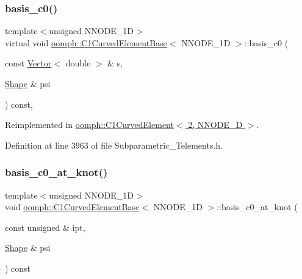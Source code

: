 \subsubsection{\texorpdfstring{basis\+\_\+c0()}{basis\_c0()}}
{\footnotesize\ttfamily template$<$unsigned N\+N\+O\+D\+E\+\_\+1D$>$ \\
virtual void \hyperlink{classoomph_1_1C1CurvedElementBase}{oomph\+::\+C1\+Curved\+Element\+Base}$<$ N\+N\+O\+D\+E\+\_\+1D $>$\+::basis\+\_\+c0 (\begin{DoxyParamCaption}\item[{const \hyperlink{classoomph_1_1Vector}{Vector}$<$ double $>$ \&}]{s,  }\item[{\hyperlink{classoomph_1_1Shape}{Shape} \&}]{psi }\end{DoxyParamCaption}) const\hspace{0.3cm}{\ttfamily [inline]}, {\ttfamily [virtual]}}



Reimplemented in \hyperlink{classoomph_1_1C1CurvedElement_3_012_00_01NNODE__1D_01_4_a88435c4bcf40bbe214598d76c88b49fc}{oomph\+::\+C1\+Curved\+Element$<$ 2, N\+N\+O\+D\+E\+\_\+D $>$}.



Definition at line 3963 of file Subparametric\+\_\+\+Telements.\+h.

\mbox{\label{classoomph_1_1C1CurvedElementBase_a8f49d1ed702baf3693960c5d278d1495}} 
\subsubsection{\texorpdfstring{basis\+\_\+c0\+\_\+at\+\_\+knot()}{basis\_c0\_at\_knot()}}
{\footnotesize\ttfamily template$<$unsigned N\+N\+O\+D\+E\+\_\+1D$>$ \\
void \hyperlink{classoomph_1_1C1CurvedElementBase}{oomph\+::\+C1\+Curved\+Element\+Base}$<$ N\+N\+O\+D\+E\+\_\+1D $>$\+::basis\+\_\+c0\+\_\+at\+\_\+knot (\begin{DoxyParamCaption}\item[{const unsigned \&}]{ipt,  }\item[{\hyperlink{classoomph_1_1Shape}{Shape} \&}]{psi }\end{DoxyParamCaption}) const\hspace{0.3cm}{\ttfamily [inline]}}




